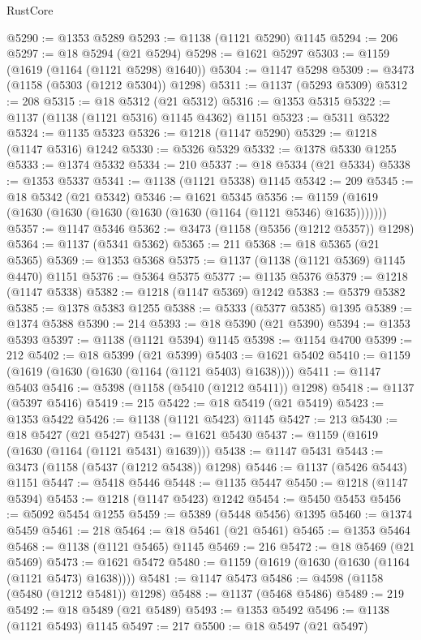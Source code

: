 \begin{lexlean}{RustCore}
\begin{coremodule}
@5290 := @1353 @5289
@5293 := @1138 (@1121 @5290) @1145
@5294 := 206
@5297 := @18 @5294 (@21 @5294)
@5298 := @1621 @5297
@5303 := @1159 (@1619 (@1164 (@1121 @5298) @1640))
@5304 := @1147 @5298
@5309 := @3473 (@1158 (@5303 (@1212 @5304)) @1298)
@5311 := @1137 (@5293 @5309)
@5312 := 208
@5315 := @18 @5312 (@21 @5312)
@5316 := @1353 @5315
@5322 := @1137 (@1138 (@1121 @5316) @1145 @4362) @1151
@5323 := @5311 @5322
@5324 := @1135 @5323
@5326 := @1218 (@1147 @5290)
@5329 := @1218 (@1147 @5316) @1242
@5330 := @5326 @5329
@5332 := @1378 @5330 @1255
@5333 := @1374 @5332
@5334 := 210
@5337 := @18 @5334 (@21 @5334)
@5338 := @1353 @5337
@5341 := @1138 (@1121 @5338) @1145
@5342 := 209
@5345 := @18 @5342 (@21 @5342)
@5346 := @1621 @5345
@5356 := @1159 (@1619 (@1630 (@1630 (@1630 (@1630 (@1630 (@1164 (@1121 @5346) @1635)))))))
@5357 := @1147 @5346
@5362 := @3473 (@1158 (@5356 (@1212 @5357)) @1298)
@5364 := @1137 (@5341 @5362)
@5365 := 211
@5368 := @18 @5365 (@21 @5365)
@5369 := @1353 @5368
@5375 := @1137 (@1138 (@1121 @5369) @1145 @4470) @1151
@5376 := @5364 @5375
@5377 := @1135 @5376
@5379 := @1218 (@1147 @5338)
@5382 := @1218 (@1147 @5369) @1242
@5383 := @5379 @5382
@5385 := @1378 @5383 @1255
@5388 := @5333 (@5377 @5385) @1395
@5389 := @1374 @5388
@5390 := 214
@5393 := @18 @5390 (@21 @5390)
@5394 := @1353 @5393
@5397 := @1138 (@1121 @5394) @1145
@5398 := @1154 @4700
@5399 := 212
@5402 := @18 @5399 (@21 @5399)
@5403 := @1621 @5402
@5410 := @1159 (@1619 (@1630 (@1630 (@1164 (@1121 @5403) @1638))))
@5411 := @1147 @5403
@5416 := @5398 (@1158 (@5410 (@1212 @5411)) @1298)
@5418 := @1137 (@5397 @5416)
@5419 := 215
@5422 := @18 @5419 (@21 @5419)
@5423 := @1353 @5422
@5426 := @1138 (@1121 @5423) @1145
@5427 := 213
@5430 := @18 @5427 (@21 @5427)
@5431 := @1621 @5430
@5437 := @1159 (@1619 (@1630 (@1164 (@1121 @5431) @1639)))
@5438 := @1147 @5431
@5443 := @3473 (@1158 (@5437 (@1212 @5438)) @1298)
@5446 := @1137 (@5426 @5443) @1151
@5447 := @5418 @5446
@5448 := @1135 @5447
@5450 := @1218 (@1147 @5394)
@5453 := @1218 (@1147 @5423) @1242
@5454 := @5450 @5453
@5456 := @5092 @5454 @1255
@5459 := @5389 (@5448 @5456) @1395
@5460 := @1374 @5459
@5461 := 218
@5464 := @18 @5461 (@21 @5461)
@5465 := @1353 @5464
@5468 := @1138 (@1121 @5465) @1145
@5469 := 216
@5472 := @18 @5469 (@21 @5469)
@5473 := @1621 @5472
@5480 := @1159 (@1619 (@1630 (@1630 (@1164 (@1121 @5473) @1638))))
@5481 := @1147 @5473
@5486 := @4598 (@1158 (@5480 (@1212 @5481)) @1298)
@5488 := @1137 (@5468 @5486)
@5489 := 219
@5492 := @18 @5489 (@21 @5489)
@5493 := @1353 @5492
@5496 := @1138 (@1121 @5493) @1145
@5497 := 217
@5500 := @18 @5497 (@21 @5497)

\end{coremodule}
\end{lexlean}
